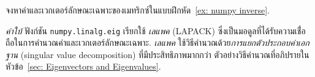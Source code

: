 %	
%
%	
%
%	

%	

%	
%
%	


%	
%
%	

\begin{Exercise}
	\label{ex: numpy eigenvector}
	
	จงหาค่าและเวกเตอร์ลักษณะเฉพาะของเมทริกซ์ในแบบฝึกหัด~\ref{ex: numpy inverse}.
	
	\textit{คำใบ้} ฟังก์ชัน \texttt{numpy.linalg.eig} เรียกใช้ \textit{เลแพค} (LAPACK) ซึ่งเป็นมอดูลที่ได้รับความเชื่่อถือในการคำนวณค่าและเวกเตอร์ลักษณะเฉพาะ.
	\textit{เลแพค} ใช้วิธีคำนวณด้วย\textit{การแยกตัวประกอบค่าเอกฐาน} (singular value decomposition) ที่มีประสิทธิภาพมากกว่า ตัวอย่างวิธีคำนวณที่อภิปรายในหัวข้อ~\ref{sec: Eigenvectors and Eigenvalues}.	
\end{Exercise}



